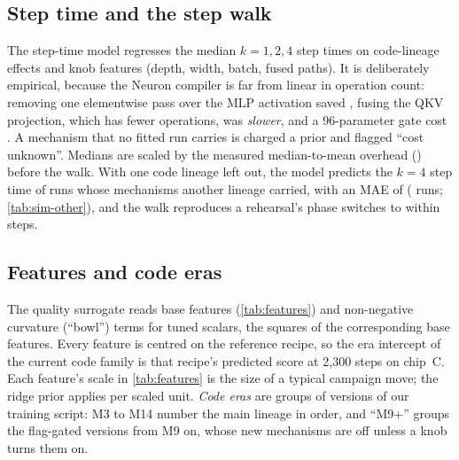 \subsection{Step time and the step walk}
\label{app:steptime}

The step-time model regresses the median $k\!=\!1,2,4$ step times on code-lineage effects and knob features (depth,
width, batch, fused paths). It is deliberately empirical, because the Neuron compiler is far from linear in
operation count: removing one elementwise pass over the MLP activation saved \docnum{}, fusing the
QKV projection, which has fewer operations, was \docnum{} \emph{slower}, and a 96-parameter gate cost
\docnum{}. A mechanism that no fitted run carries is charged a \docnum{} prior and
flagged ``cost unknown''. Medians are scaled by the measured median-to-mean overhead () before the walk.
With one code lineage left out, the model predicts the $k\!=\!4$ step time of runs whose mechanisms another lineage
carried, with an MAE of  ( runs; \cref{tab:sim-other}), and the walk reproduces
a rehearsal's phase switches to within \docnum{} steps.

\subsection{Features and code eras}

The quality surrogate reads  base features (\cref{tab:features}) and 
non-negative curvature (``bowl'') terms for tuned scalars, the squares of the corresponding base features. Every
feature is centred on the  reference recipe, so the era intercept of the current code family is that recipe's
predicted score at 2{,}300 steps on chip~C. Each feature's scale in \cref{tab:features} is the size of a typical campaign move; the ridge prior applies
per scaled unit. \emph{Code eras} are groups of versions of our training script: M3 to M14 number the main lineage in
order, and ``M9+'' groups the flag-gated versions from M9 on, whose new mechanisms are off unless a knob turns them on.

\begin{table}[!htbp]
  \centering
  \caption{\textbf{Knob features of the quality surrogate} (\texttt{ffsim/quality.py}, \texttt{FEATURES}). Two
encodings were set with campaign outcomes in view: the \texttt{leaky\_sq} bowl, centred on the slope 0.35 that had
measured best, and \texttt{acc\_in\_graph}, added after the  mechanism had measured well.}
  \label{tab:features}
  
\end{table}

